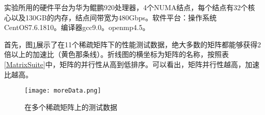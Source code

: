 实验所用的硬件平台为华为鲲鹏920处理器，4个NUMA结点，每个结点有32个核心以及130GB的内存，结点间带宽为480Gbps。软件平台：操作系统CentOS7.6.1810。编译器gcc9.0。openmp4.5。

首先，图\ref{在多个稀疏矩阵上的测试数据}展示了在11个稀疏矩阵下的性能测试数据，绝大多数的矩阵都能够获得2倍以上的加速比（黄色那条线）。折线图的横坐标为矩阵的名称，按照表\ref{MatrixSuite}中，矩阵的并行性从高到低排序。可以看出，矩阵并行性越高，加速比越高。

\begin{figure}[htbp]
    \centering
    \texttt{[image: moreData.png]}
    \caption{在多个稀疏矩阵上的测试数据}
    \label{在多个稀疏矩阵上的测试数据}
\end{figure}

~\\




